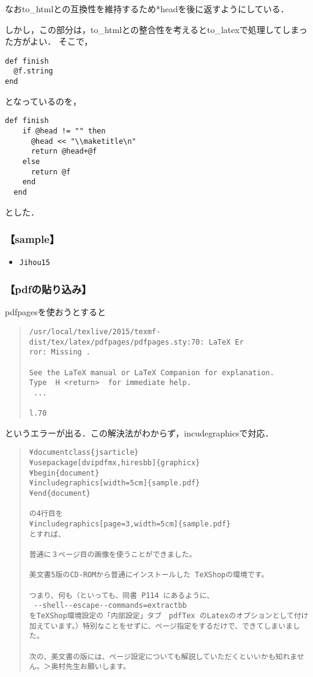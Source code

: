 なおto\_htmlとの互換性を維持するため*headを後に返すようにしている．

しかし，この部分は，to\_htmlとの整合性を考えるとto\_latexで処理してしまった方がよい．
そこで，
\begin{lstlisting}[style=customRuby]
def finish
  @f.string
end
\end{lstlisting}
となっているのを，
\begin{lstlisting}[style=customRuby]
  def finish
    if @head != "" then
      @head << "\\maketitle\n"
      return @head+@f
    else
      return @f
    end
  end
\end{lstlisting}
とした．

\subsubsection{【sample】}\begin{itemize}
\item \verb|Jihou15|
\end{itemize}
\subsubsection{【pdfの貼り込み】}
pdfpagesを使おうとすると
\begin{quote}\begin{verbatim}
/usr/local/texlive/2015/texmf-dist/tex/latex/pdfpages/pdfpages.sty:70: LaTeX Er
ror: Missing .

See the LaTeX manual or LaTeX Companion for explanation.
Type  H <return>  for immediate help.
 ...                                              
                                                  
l.70 
\end{verbatim}\end{quote}
というエラーが出る．この解決法がわからず，incudegraphicsで対応．
\begin{quote}\begin{verbatim}
¥documentclass{jsarticle}
¥usepackage[dvipdfmx,hiresbb]{graphicx}
¥begin{document}
¥includegraphics[width=5cm]{sample.pdf}
¥end{document}

の4行目を
¥includegraphics[page=3,width=5cm]{sample.pdf}
とすれば、

普通に３ページ目の画像を使うことができました。

美文書5版のCD-ROMから普通にインストールした TeXShopの環境です。

つまり、何も（といっても、同書 P114 にあるように、
 --shell--escape--commands=extractbb 
をTeXShop環境設定の「内部設定」タブ　pdfTex のLatexのオプションとして付け加えています。）特別なことをせずに、ページ指定をするだけで、できてしまいました。

次の、美文書の版には、ページ設定についても解説していただくといいかも知れません。＞奥村先生お願いします。
\end{verbatim}\end{quote}
